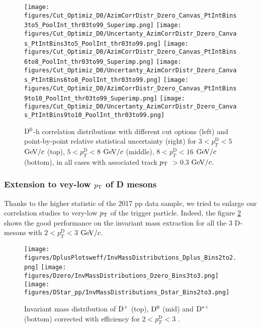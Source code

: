 \begin{figure}[!htp]
\centering
{\texttt{[image: figures/Cut\_Optimiz\_D0/AzimCorrDistr\_Dzero\_Canvas\_PtIntBins3to5\_PoolInt\_thr03to99\_Superimp.png]}}
{\texttt{[image: figures/Cut\_Optimiz\_D0/Uncertanty\_AzimCorrDistr\_Dzero\_Canvas\_PtIntBins3to5\_PoolInt\_thr03to99.png]}}
{\texttt{[image: figures/Cut\_Optimiz\_D0/AzimCorrDistr\_Dzero\_Canvas\_PtIntBins6to8\_PoolInt\_thr03to99\_Superimp.png]}}
{\texttt{[image: figures/Cut\_Optimiz\_D0/Uncertanty\_AzimCorrDistr\_Dzero\_Canvas\_PtIntBins6to8\_PoolInt\_thr03to99.png]}}
{\texttt{[image: figures/Cut\_Optimiz\_D0/AzimCorrDistr\_Dzero\_Canvas\_PtIntBins9to10\_PoolInt\_thr03to99\_Superimp.png]}}
{\texttt{[image: figures/Cut\_Optimiz\_D0/Uncertanty\_AzimCorrDistr\_Dzero\_Canvas\_PtIntBins9to10\_PoolInt\_thr03to99.png]}}

\caption{${\rm D^0}$-h correlation distributions with different cut options (left) and point-by-point relative statistical uncertainty (right) for $3< p_{T}^{\text{D}}< 5$ $\mathrm{GeV}/c$ (top), $5< p_{T}^{\text{D}}< 8$ $\mathrm{GeV}/c$ (middle), $8< p_{T}^{\text{D}}< 16$ $\mathrm{GeV}/c$ (bottom), in all cases with associated track $p_{\rm T}$ $> 0.3$ $\mathrm{GeV}/c$.}
\label{fig:cutoptD0}
\end{figure}

 \subsubsection{Extension to vey-low $p_{\rm T}$ of D mesons}
 
Thanks to the higher statistic of the 2017 pp data sample, we tried to enlarge our correlation studies to very-low $p_{\rm T}$ of the trigger particle. Indeed, the figure \ref{fig:VeryLowPt} shows the good performance on the invariant mass extraction for all the 3 D-mesons with $2< p_{T}^{\text{D}}< 3$ $\mathrm{GeV}/c$.
\begin{figure}[!htp]
\centering
{\texttt{[image: figures/DplusPlotsweff/InvMassDistributions\_Dplus\_Bins2to2.png]}}
{\texttt{[image: figures/Dzero/InvMassDistributions\_Dzero\_Bins3to3.png]}}
{\texttt{[image: figures/DStar\_pp/InvMassDistributions\_Dstar\_Bins2to3.png]}}
\caption{Invariant mass distribution of ${\rm D^+}$ (top), ${\rm D^0}$ (mid) and ${\rm D^{*+}}$ (bottom) corrected with efficiency for  $2< p_{T}^{\text{D}}< 3$ .}
\label{fig:VeryLowPt}
\end{figure}

